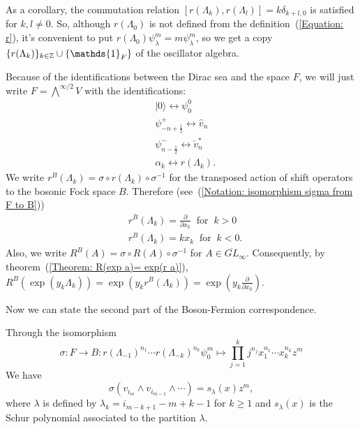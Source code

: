 As a corollary, the commutation relation $[r(\Lambda_k),r(\Lambda_l)]=k\delta_{k+l,0}$ is satisfied for $k,l\neq0$. So, although $r(\Lambda_0)$ is not defined from the definition~(\ref{Equation: r}), it's convenient to put $r(\Lambda_0)\psi_\lambda^m=m\psi_\lambda^m$, so we get a copy $\{r(\Lambda_k)\}_{k\in\bb{Z}}\cup\{\mathds{1}_F\}$ of the oscillator algebra.
\begin{dang}
    \begin{notation}
        Because of the identifications between the Dirac sea and the space $F$, we will just write $F=\bigwedge^{\infty/2}V$ with the identifications:
        \begin{align*}
            &|0\rangle \longleftrightarrow \psi_0^0\\
            &\psi^+_{-n+\frac{1}{2}} \longleftrightarrow \hat{v}_n\\
            &\psi^-_{n-\frac{1}{2}} \longleftrightarrow \check{v}^*_n\\
            &\alpha_k \longleftrightarrow r(\Lambda_k).
        \end{align*}
        We write $r^B(\Lambda_k)=\sigma\circ r(\Lambda_k)\circ\sigma^{-1}$ for the transposed action of shift operators to the bosonic Fock space $B$. Therefore (see~(\ref{Notation: isomorphism sigma from F to B}))
        \begin{equation}
            \begin{split}
                &r^B(\Lambda_k)= \frac{\partial}{\partial x_k}\;\;\text{for}\;\; k>0\\
                &r^B(\Lambda_k)=kx_k\;\;\text{for}\;\;k<0.
            \end{split}
        \end{equation}
        Also, we write $R^B(A)=\sigma\circ R(A)\circ \sigma^{-1}$ for $A\in \overline{GL}_\infty$. Consequently, by theorem~(\ref{Theorem: R(exp a)= exp(r a)}), $R^B(\exp(y_k\Lambda_k))=\exp(y_kr^B(\Lambda_k))=\exp\left(y_k\frac{\partial}{\partial x_k}\right)$.
    \end{notation}
\end{dang}
Now we can state the second part of the Boson-Fermion correspondence.
\begin{dang}
    \begin{theorem}\cite{kac2013bombay}\label{Theorem: the second part of the boson-fermion correspondence}
        Through the isomorphism
        \begin{equation}
            \sigma: F \rightarrow B : r(\Lambda_{-1})^{n_1}\cdots r(\Lambda_{-k})^{n_k}\psi_0^m\mapsto \prod_{j=1}^k j^{n_j}x_1^{n_1}\cdots x_k^{n_k}z^m
        \end{equation}
        We have
        \begin{equation}
            \sigma(v_{i_m}\wedge v_{i_{m-1}}\wedge\cdots ) = s_\lambda(x)z^m,
        \end{equation}
        where $\lambda$ is defined by $\lambda_k=i_{m-k+1}-m+k-1$ for $k\geq 1$ and $s_\lambda(x)$ is the Schur polynomial associated to the partition $\lambda$.
    \end{theorem}
\end{dang}
